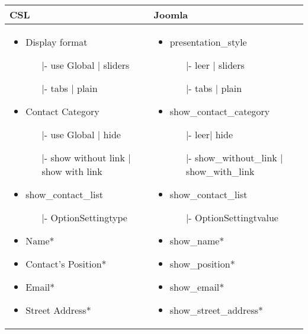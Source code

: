 \begin{minipage}{0.6\textwidth}
\begin{longtable}{|p{} | p{}|}
\hline
\textbf{CSL} & \textbf{Joomla} \\ 
\hline
 \begin{itemize}
\item Display format
	\begin{enumerate}
	\item[|-] use Global | sliders
	\item[|-] tabs | plain
	\end{enumerate}
\item Contact Category
	\begin{enumerate}
	\item[|-] use Global | hide
	\item[|-] show without link | show with link
	\end{enumerate} 
\item show\_contact\_list
	\begin{enumerate}
		\item[|-] OptionSettingtype
	\end{enumerate} 
\item Name* 
\item Contact's Position* 
\item Email* 
\item Street Address* 
\end{itemize}
 & 
 \begin{itemize}
\item presentation\_style
\begin{enumerate}
	\item[|-] leer | sliders
	\item[|-] tabs | plain
	\end{enumerate} 
\item show\_contact\_category
\begin{enumerate}
	\item[|-]leer| hide
	\item[|-]show\_without\_link | show\_with\_link
	\end{enumerate} 
\item show\_contact\_list
\begin{enumerate}
		\item[|-] OptionSettingtvalue
	\end{enumerate} 
\item show\_name* 
\item show\_position* 
\item show\_email* 
\item show\_street\_address* 
\end{itemize}
\\
\hline
\end{longtable}
\end{minipage}


